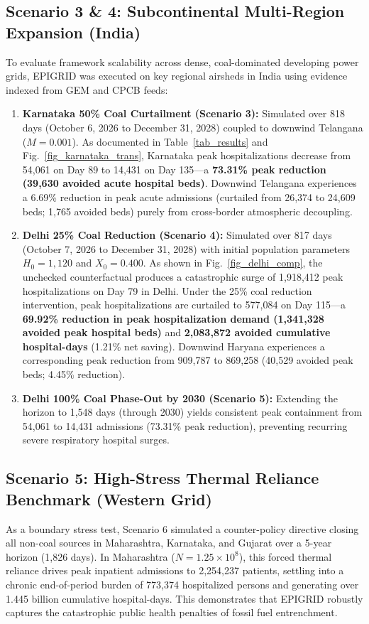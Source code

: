 \documentclass[conference]{IEEEtran}
\renewcommand{\_}{\textunderscore\allowbreak{}}%
\begin{document}
\subsection{Scenario 3 \& 4: Subcontinental Multi-Region Expansion (India)}
To evaluate framework scalability across dense, coal-dominated developing power grids, EPIGRID was executed on key regional airsheds in India using evidence indexed from GEM and CPCB feeds:
\begin{enumerate}
    \item \textbf{Karnataka 50\% Coal Curtailment (Scenario 3):} Simulated over 818 days (October 6, 2026 to December 31, 2028) coupled to downwind Telangana ($M = 0.001$). As documented in Table~\ref{tab_results} and Fig.~\ref{fig_karnataka_trans}, Karnataka peak hospitalizations decrease from 54,061 on Day 89 to 14,431 on Day 135—a \textbf{73.31\% peak reduction (39,630 avoided acute hospital beds)}. Downwind Telangana experiences a 6.69\% reduction in peak acute admissions (curtailed from 26,374 to 24,609 beds; 1,765 avoided beds) purely from cross-border atmospheric decoupling.
    \item \textbf{Delhi 25\% Coal Reduction (Scenario 4):} Simulated over 817 days (October 7, 2026 to December 31, 2028) with initial population parameters $H_0 = 1,120$ and $X_0 = 0.400$. As shown in Fig.~\ref{fig_delhi_comp}, the unchecked counterfactual produces a catastrophic surge of 1,918,412 peak hospitalizations on Day 79 in Delhi. Under the 25\% coal reduction intervention, peak hospitalizations are curtailed to 577,084 on Day 115—a \textbf{69.92\% reduction in peak hospitalization demand (1,341,328 avoided peak hospital beds)} and \textbf{2,083,872 avoided cumulative hospital-days} (1.21\% net saving). Downwind Haryana experiences a corresponding peak reduction from 909,787 to 869,258 (40,529 avoided peak beds; 4.45\% reduction).
    \item \textbf{Delhi 100\% Coal Phase-Out by 2030 (Scenario 5):} Extending the horizon to 1,548 days (through 2030) yields consistent peak containment from 54,061 to 14,431 admissions (73.31\% peak reduction), preventing recurring severe respiratory hospital surges.
\end{enumerate}

\subsection{Scenario 5: High-Stress Thermal Reliance Benchmark (Western Grid)}
As a boundary stress test, Scenario 6 simulated a counter-policy directive closing all non-coal sources in Maharashtra, Karnataka, and Gujarat over a 5-year horizon (1,826 days). In Maharashtra ($N = 1.25\times 10^8$), this forced thermal reliance drives peak inpatient admissions to 2,254,237 patients, settling into a chronic end-of-period burden of 773,374 hospitalized persons and generating over 1.445 billion cumulative hospital-days. This demonstrates that EPIGRID robustly captures the catastrophic public health penalties of fossil fuel entrenchment.
\end{document}
